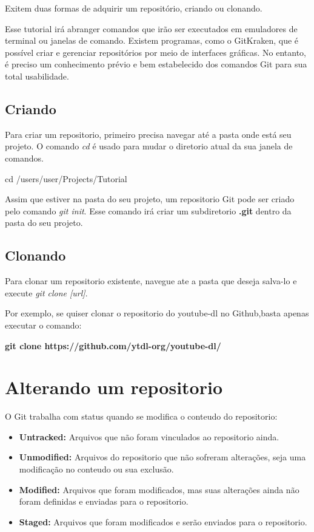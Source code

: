 \documentclass[]{article}
\begin{document}
Exitem duas formas de adquirir um repositório, criando ou clonando.

Esse tutorial irá abranger comandos que irão ser executados em emuladores de terminal ou janelas de comando. 
Existem programas, como o GitKraken, que é possível criar e gerenciar repositórios por meio de interfaces gráficas. 
No entanto, é preciso um conhecimento prévio e bem estabelecido dos comandos Git para sua total usabilidade.

\subsection*{Criando}

Para criar um repositorio, primeiro precisa navegar até a pasta onde está seu projeto. 
O comando \textit{cd} é usado para mudar o diretorio atual da sua janela de comandos.

cd /users/user/Projects/Tutorial

Assim que estiver na pasta do seu projeto, um repositorio Git pode ser criado pelo comando \textit{git init}.
 Esse comando irá criar um subdiretorio \textbf{ .git } dentro da pasta do seu projeto.

\subsection*{Clonando}

Para clonar um repositorio existente, navegue ate a pasta que deseja salva-lo e execute \textit{git clone [url]}.

Por exemplo, se quiser clonar o repositorio do youtube-dl no Github,basta apenas executar o comando: 

\textbf{git clone https://github.com/ytdl-org/youtube-dl/}

\section{Alterando um repositorio}

O Git trabalha com status quando se modifica o conteudo do repositorio:

\begin{itemize}
    \item {\textbf{Untracked: }} Arquivos que não foram vinculados ao repositorio ainda.
    \item {\textbf{Unmodified: }} Arquivos do repositorio que não sofreram alterações, seja uma modificação no conteudo ou sua exclusão.
    \item {\textbf{Modified: }} Arquivos que foram modificados, mas suas alterações ainda não foram definidas e enviadas para o repositorio.
    \item {\textbf{Staged: }} Arquivos que foram modificados e serão enviados para o repositorio.
\end{itemize}
\end{document}
